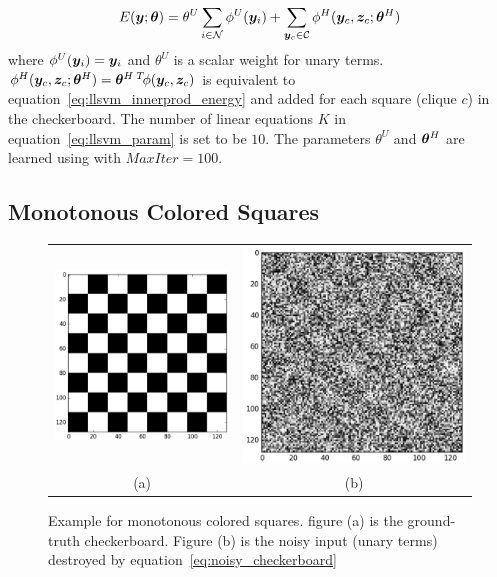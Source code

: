 \begin{align}
  \label{eq:syncheck_energy}
  E({\bm{y}};{\bm{\theta}})=\theta^U\sum_{i\in {\mathcal{N}}}{\phi^U({\bm{y}}_i)}+
  \sum_{{\bm{y}}_c\in {\mathcal{C}}}{\phi^H({\bm{y}}_c,{\bm{z}}_c;{\bm{\theta}}^H)}
\end{align}
where $\phi^U({\bm{y}}_i)={\bm{y}}_i$ and $\theta^U$ is a scalar weight for
unary terms. $\phi^H({\bm{y}}_c,{\bm{z}}_c;{\bm{\theta}}^H)={\bm{\theta}}^{H\;T} \!
\phi({\bm{y}}_c,{\bm{z}}_c)$ is equivalent to
equation~\eqref{eq:llsvm_innerprod_energy} and added for each
square (clique $c$) in the checkerboard. The number of linear
equations $K$ in equation~\eqref{eq:llsvm_param} is set to be
$10$. The parameters $\theta^U$ and ${\bm{\theta}}^H$ are learned using
 with $MaxIter=100$. 

\subsection{Monotonous Colored Squares}
\label{sec:monot-color-squar}

\begin{figure}[hb]
  \centering
  \setlength{\tabcolsep}{2pt}
  \begin{tabular}{cc}
    \includegraphics[width=0.5\columnwidth]{Part2/figures/mono_gt.png}&
                                                                            \includegraphics[width=0.5\columnwidth]{Part2/figures/mono_noisy.png}\\
    {\small (a)} & {\small (b)} 
  \end{tabular}
  \caption{\label{fig:mono_checkerboard} Example for monotonous
    colored squares. figure (a) is the ground-truth checkerboard.
    Figure (b) is the noisy input (unary terms) destroyed by
    equation~\eqref{eq:noisy_checkerboard}}
\end{figure}

